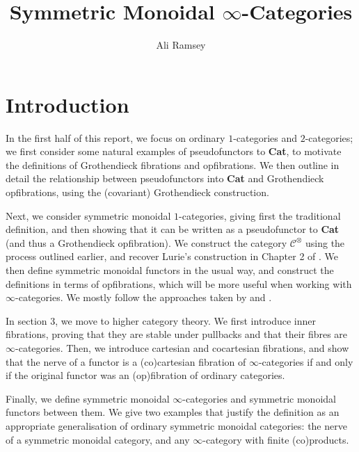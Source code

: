 \documentclass{MetricNotes2023}
\author{Ali Ramsey}
\title{Symmetric Monoidal \(\infty\)-Categories}
\date{\vspace{-5ex}}
\begin{document}
\maketitle
%

\DeclarePairedDelimiter{\norm}{\lVert}{\rVert} 
\DeclarePairedDelimiter{\abs}{\lvert}{\rvert} 
\DeclarePairedDelimiter{\ang}{\langle}{\rangle} 

\section{Introduction}

In the first half of this report, we focus on ordinary \(1\)-categories and \(2\)-categories; we first consider some natural examples of pseudofunctors to \textbf{Cat}, to motivate the definitions of Grothendieck fibrations and opfibrations. We then outline in detail the relationship between pseudofunctors into \textbf{Cat} and Grothendieck opfibrations, using the (covariant) Grothendieck construction.

Next, we consider symmetric monoidal \(1\)-categories, giving first the traditional definition, and then showing that it can be written as a pseudofunctor to \textbf{Cat} (and thus a Grothendieck opfibration). We construct the category \(\mathcal{C}^\otimes\) using the process outlined earlier, and recover Lurie's construction in Chapter 2 of \autocite{higheralgebra}. We then define symmetric monoidal functors in the usual way, and construct the definitions in terms of opfibrations, which will be more useful when working with \(\infty\)-categories. We mostly follow the approaches taken by \autocite{symmetricmonoidal} and \autocite{groth2015short}. 

In section 3, we move to higher category theory. We first introduce inner fibrations, proving that they are stable under pullbacks and that their fibres are \(\infty\)-categories. Then, we introduce cartesian and cocartesian fibrations, and show that the nerve of a functor is a (co)cartesian fibration of \(\infty\)-categories if and only if the original functor was an (op)fibration of ordinary categories. 

Finally, we define symmetric monoidal \(\infty\)-categories and symmetric monoidal functors between them. We give two examples that justify the definition as an appropriate generalisation of ordinary symmetric monoidal categories: the nerve of a symmetric monoidal category, and any \(\infty\)-category with finite (co)products. 
\end{document}
